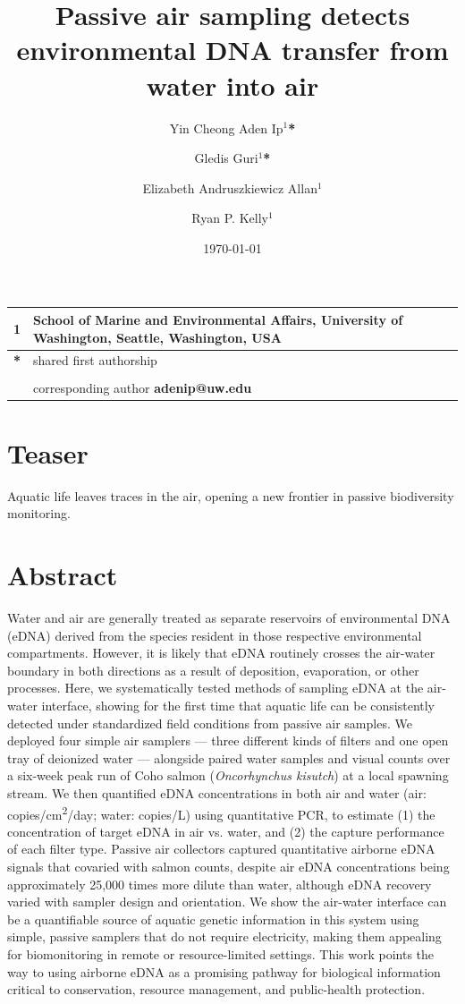 \documentclass{article}
\title{Passive air sampling detects environmental DNA transfer from water into air}
\author{Yin Cheong Aden Ip$^1$\textbf{*} \and
Gledis Guri$^1$\textbf{*} \and
Elizabeth Andruszkiewicz Allan$^1$ \and
Ryan P. Kelly$^1$}
\date{\today}
\begin{document}
\maketitle

\section*{}

\begin{center}
\begin{tabular}{ll}
1 & School of Marine and Environmental Affairs, University of Washington, Seattle, Washington, USA \\
\hline
\textbf{*} & shared first authorship\\
&\\
& corresponding author \textbf{adenip@uw.edu}
\end{tabular}
\end{center}

\section*{Teaser}
Aquatic life leaves traces in the air, opening a new frontier in passive biodiversity monitoring.

\section*{Abstract}
Water and air are generally treated as separate reservoirs of environmental DNA (eDNA) derived from the species resident in those respective environmental compartments. However, it is likely that eDNA routinely crosses the air-water boundary in both directions as a result of deposition, evaporation, or other processes. Here, we systematically tested methods of sampling eDNA at the air-water interface, showing for the first time that aquatic life can be consistently detected under standardized field conditions from passive air samples. We deployed four simple air samplers — three different kinds of filters and one open tray of deionized water — alongside paired water samples and visual counts over a six-week peak run of Coho salmon (\textit{Oncorhynchus kisutch}) at a local spawning stream. We then quantified eDNA concentrations in both air and water (air: copies/cm\textsuperscript{2}/day; water: copies/L) using quantitative PCR, to estimate (1) the concentration of target eDNA in air vs. water, and (2) the capture performance of each filter type. Passive air collectors captured quantitative airborne eDNA signals that covaried with salmon counts, despite air eDNA concentrations being approximately 25,000 times more dilute than water, although eDNA recovery varied with sampler design and orientation. We show the air-water interface can be a quantifiable source of aquatic genetic information in this system using simple, passive samplers that do not require electricity, making them appealing for biomonitoring in remote or resource-limited settings. This work points the way to using airborne eDNA as a promising pathway for biological information critical to conservation, resource management, and public-health protection.
\end{document}
